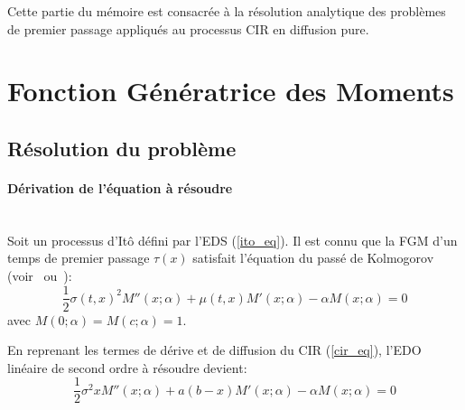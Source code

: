 \label{sec:FPT_Diffusion}

Cette partie du mémoire est consacrée à la résolution analytique des problèmes de premier passage appliqués au processus \acl{CIR} en diffusion pure.

\section{Fonction Génératrice des Moments}\label{section_fgm_eq}
\subsection{Résolution du problème}
\paragraph{Dérivation de l'équation à résoudre}\phantom{}\\
Soit un processus d'Itô défini par l'\ac{EDS} (\ref{ito_eq}).
Il est connu que la \acl{FGM} d'un temps de premier passage $\tau(x)$ satisfait l'équation du passé de Kolmogorov (voir~\cite{cox2017} ou~\cite{lefebvre2007}): 
\[
\frac{1}{2}\sigma{(t,x)}^2M''(x;\alpha)+\mu(t,x)M'(x;\alpha)-\alpha M(x;\alpha)=0
\]
avec $M(0;\alpha)=M(c;\alpha)=1$. 

En reprenant les termes de dérive et de diffusion du \acs{CIR} (\ref{cir_eq}), l'\ac{EDO} linéaire de second ordre à résoudre devient: 
\begin{equation}\label{ode_fgm}
    \frac{1}{2}\sigma^2xM''(x;\alpha)+a(b-x)M'(x;\alpha)-\alpha M(x;\alpha)=0
\end{equation}

